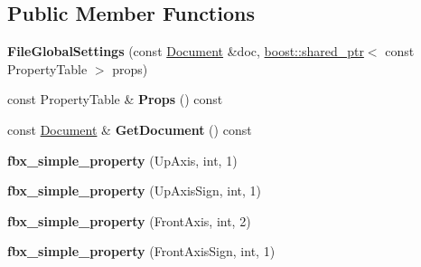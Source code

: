 \subsection*{Public Member Functions}
\begin{DoxyCompactItemize}
\item 
\hypertarget{class_assimp_1_1_f_b_x_1_1_file_global_settings_a338e63c8316d1827b824cbed28df9caf}{{\bfseries File\+Global\+Settings} (const \hyperlink{class_assimp_1_1_f_b_x_1_1_document}{Document} \&doc, \hyperlink{classboost_1_1shared__ptr}{boost\+::shared\+\_\+ptr}$<$ const Property\+Table $>$ props)}\label{class_assimp_1_1_f_b_x_1_1_file_global_settings_a338e63c8316d1827b824cbed28df9caf}

\item 
\hypertarget{class_assimp_1_1_f_b_x_1_1_file_global_settings_a4c4d8e3bee62dddece393c2248918746}{const Property\+Table \& {\bfseries Props} () const }\label{class_assimp_1_1_f_b_x_1_1_file_global_settings_a4c4d8e3bee62dddece393c2248918746}

\item 
\hypertarget{class_assimp_1_1_f_b_x_1_1_file_global_settings_acc0d585f70d136e220cd3cdee0e00cf4}{const \hyperlink{class_assimp_1_1_f_b_x_1_1_document}{Document} \& {\bfseries Get\+Document} () const }\label{class_assimp_1_1_f_b_x_1_1_file_global_settings_acc0d585f70d136e220cd3cdee0e00cf4}

\item 
\hypertarget{class_assimp_1_1_f_b_x_1_1_file_global_settings_a3675002412f7ef9566fe83084daf0805}{{\bfseries fbx\+\_\+simple\+\_\+property} (Up\+Axis, int, 1)}\label{class_assimp_1_1_f_b_x_1_1_file_global_settings_a3675002412f7ef9566fe83084daf0805}

\item 
\hypertarget{class_assimp_1_1_f_b_x_1_1_file_global_settings_a7088be45da6c82df1cff62119a982f52}{{\bfseries fbx\+\_\+simple\+\_\+property} (Up\+Axis\+Sign, int, 1)}\label{class_assimp_1_1_f_b_x_1_1_file_global_settings_a7088be45da6c82df1cff62119a982f52}

\item 
\hypertarget{class_assimp_1_1_f_b_x_1_1_file_global_settings_ab5628d312f3327f0d0029723014b4b94}{{\bfseries fbx\+\_\+simple\+\_\+property} (Front\+Axis, int, 2)}\label{class_assimp_1_1_f_b_x_1_1_file_global_settings_ab5628d312f3327f0d0029723014b4b94}

\item 
\hypertarget{class_assimp_1_1_f_b_x_1_1_file_global_settings_ae7d0f36c1d2378027cb1fccabcacf72f}{{\bfseries fbx\+\_\+simple\+\_\+property} (Front\+Axis\+Sign, int, 1)}\label{class_assimp_1_1_f_b_x_1_1_file_global_settings_ae7d0f36c1d2378027cb1fccabcacf72f}


\end{DoxyCompactItemize}
